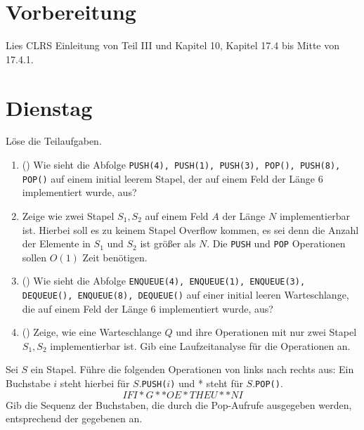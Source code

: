 \documentclass{uebung_cs}
\begin{document}
\section*{Vorbereitung}
Lies CLRS Einleitung von Teil III und Kapitel 10, Kapitel 17.4 bis Mitte von 17.4.1.

\section*{Dienstag}

\begin{aufgabe}
	Löse die Teilaufgaben.
	\begin{enumerate}
		\item (\warmup) Wie sieht die Abfolge \texttt{PUSH(4), PUSH(1), PUSH(3), POP(), PUSH(8), POP()} auf einem initial leerem Stapel, der auf einem Feld der Länge 6 implementiert wurde, aus?
		\item Zeige wie zwei Stapel $S_1, S_2$ auf einem Feld $A$ der Länge $N$ implementierbar ist.
		Hierbei soll es zu keinem Stapel Overflow kommen, es sei denn die Anzahl der Elemente in $S_1$ und $S_2$ ist größer als $N$.
		Die \texttt{PUSH} und \texttt{POP} Operationen sollen $O(1)$ Zeit benötigen.
		\item (\warmup) Wie sieht die Abfolge \texttt{ENQUEUE(4), ENQUEUE(1), ENQUEUE(3), DEQUEUE(), ENQUEUE(8), DEQUEUE()} auf einer initial leeren Warteschlange, die auf einem Feld der Länge 6 implementiert wurde, aus?
		\item (\hard) Zeige, wie eine Warteschlange $Q$ und ihre Operationen mit nur zwei Stapel $S_1, S_2$ implementierbar ist.
		Gib eine Laufzeitanalyse für die Operationen an.
	\end{enumerate}
\end{aufgabe}

\begin{aufgabe}
	Sei $S$ ein Stapel.
	Führe die folgenden Operationen von links nach rechts aus: Ein Buchstabe $i$ steht hierbei für $S.$\texttt{PUSH(}$i$\texttt{)} und * steht für $S.$\texttt{POP()}.
	\[IFI*G**OE*THEU**NI\]
	Gib die Sequenz der Buchstaben, die durch die Pop-Aufrufe ausgegeben werden, entsprechend der gegebenen an.
\end{aufgabe}
\end{document}

